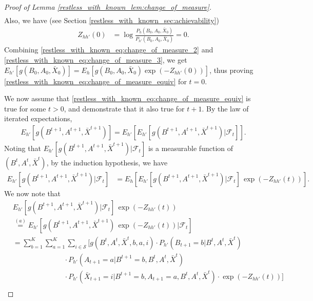 \begin{proof}[Proof of Lemma \ref{restless_with_known_lem:change_of_measure}]
\begin{align}
 \end{align}\endgroup
 Also, we have (see Section \ref{restless_with_known_sec:achievability})
 \begingroup \allowdisplaybreaks\begin{align}
 	Z_{hh'}(0)&=\log \frac{P_h(B_0,A_0,\bar{X}_0)}{P_{h'}(B_0,A_0,\bar{X}_0)}=0.\label{restless_with_known_eq:change_of_measure_3}
 \end{align}\endgroup
 Combining \eqref{restless_with_known_eq:change_of_measure_2} and \eqref{restless_with_known_eq:change_of_measure_3}, we get $E_{h'}[g(B_0,A_0,\bar{X}_0)]=E_h[g(B_0,A_0,\bar{X}_0)\exp (-Z_{hh'}(0))]$, thus proving \eqref{restless_with_known_eq:change_of_measure_equiv} for $t=0$.
 
 We now assume that \eqref{restless_with_known_eq:change_of_measure_equiv} is true for some $t>0$, and demonstrate that it also true for $t+1$. By the law of iterated expectations,
 \begingroup \allowdisplaybreaks\begin{align}
 	E_{h'}[g(B^{t+1},A^{t+1},\bar{X}^{t+1})]=E_{h'}[E_{h'}[g(B^{t+1},A^{t+1},\bar{X}^{t+1})|\mathcal{F}_t]].\label{restless_with_known_eq:change_of_measure_4}
 \end{align}\endgroup
Noting that $E_{h'}[g(B^{t+1},A^{t+1},\bar{X}^{t+1})|\mathcal{F}_t]$ is a measurable function of $(B^t,A^t,\bar{X}^t)$, by the induction hypothesis, we have
 \begingroup \allowdisplaybreaks\begin{align}
 	E_{h'}[g(B^{t+1},A^{t+1},\bar{X}^{t+1})|\mathcal{F}_t]&=E_h[E_{h'}[g(B^{t+1},A^{t+1},\bar{X}^{t+1})|\mathcal{F}_t]\,\exp(-Z_{hh'}(t))].\label{restless_with_known_eq:change_of_measure_5}
 \end{align}\endgroup
 We now note that
 \begingroup \allowdisplaybreaks\begin{align}
 	& E_{h'}[g(B^{t+1},A^{t+1},\bar{X}^{t+1})|\mathcal{F}_t]\,\exp(-Z_{hh'}(t))\nonumber\\
 	&\stackrel{(a)}{=}E_{h'}[g(B^{t+1},A^{t+1},\bar{X}^{t+1})\,\exp(-Z_{hh'}(t))|\mathcal{F}_t]\,\nonumber\\
 	&=\sum\limits_{b=1}^{K}\sum\limits_{a=1}^{K}\sum\limits_{i\in\mathcal{S}}\bigg[g(B^t,A^t,\bar{X}^t,b, a, i)\cdot P_{h'}(B_{t+1}=b|B^t,A^t,\bar{X}^t)\nonumber\\
 	&\hspace{3cm} \cdot P_{h'}(A_{t+1}=a|B^{t+1}=b,B^t,A^t,\bar{X}^t)\nonumber\\
	&\hspace{3cm}\cdot P_{h'}(\bar{X}_{t+1}=i|B^{t+1}=b,A_{t+1}=a,B^t,A^t,\bar{X}^t)\cdot \exp(-Z_{hh'}(t))\bigg]\nonumber\\

\end{align}
\end{proof}
